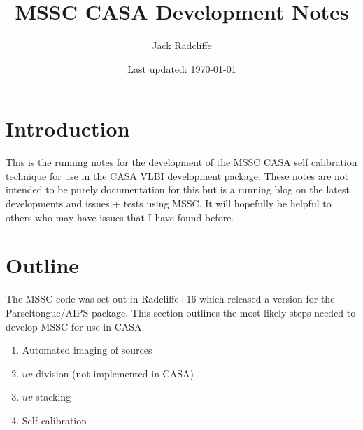 


        
        \title{MSSC CASA Development Notes}
        \date{Last updated: \today}
        \author{Jack Radcliffe}
        \maketitle
        \tableofcontents
        
\section{Introduction}
This is the running notes for the development of the MSSC CASA self calibration technique for use in the CASA VLBI development package. These notes are not intended to be purely documentation for this but is a running blog on the latest developments and issues + tests using MSSC. It will hopefully be helpful to others who may have issues that I have found before. 

\section{Outline}
The MSSC code was set out in Radcliffe+16 which released a version for the Parseltongue/AIPS package. This section outlines the most likely steps needed to develop MSSC for use in CASA. 

\begin{enumerate}
	\item Automated imaging of sources
	\item $uv$ division (not implemented in CASA)
	\item $uv$ stacking
	\item Self-calibration
\end{enumerate}


      
